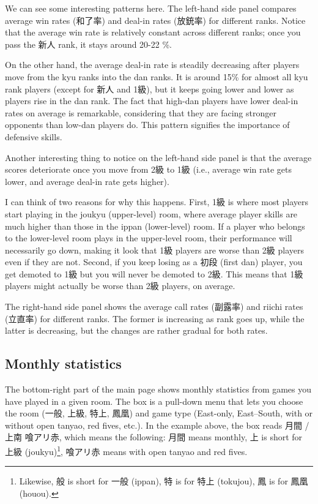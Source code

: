 \bigskip
We can see some interesting patterns here. The left-hand side panel compares average win rates (和了率) and deal-in rates (放銃率) for different ranks. Notice that the average win rate is relatively constant across different ranks; once you pass the 新人 rank, it stays around 20-22 \%. 

\bigskip
On the other hand, the average deal-in rate is steadily decreasing after players move from the {\jap kyu} ranks into the {\jap dan} ranks. It is around 15\% for almost all {\jap kyu} rank players (except for 新人 and 1級), but it keeps going lower and lower as players rise in the {\jap dan} rank. The fact that high-{\jap dan} players have lower deal-in rates on average is remarkable, considering that they are facing stronger opponents than low-{\jap dan} players do. This pattern signifies the importance of defensive skills.

\bigskip

Another interesting thing to notice on the left-hand side panel is that the average scores deteriorate once you move from 2級 to 1級 (i.e., average win rate gets lower, and average deal-in rate gets higher). 

\bigskip
I can think of two reasons for why this happens. First, 1級 is where most players start playing in the {\jap joukyu} (upper-level) room, where average player skills are much higher than those in the {\jap ippan} (lower-level) room. If a player who belongs to the lower-level room plays in the upper-level room, their performance will necessarily go down, making it look that 1級 players are worse than 2級 players even if they are not. Second, if you keep losing as a 初段 (first {\jap dan}) player, you get demoted to 1級 but you will never be demoted to 2級. This means that 1級 players might actually be worse than 2級 players, on average. 

\bigskip

The right-hand side panel shows the average call rates (副露率) and {\jap riichi} rates (立直率) for different ranks. The former is increasing as rank goes up, while the latter is decreasing, but the changes are rather gradual for both rates. 

\subsection{Monthly statistics}
The bottom-right part of the main page shows monthly statistics from games you have played in a given room. The box is a pull-down menu that lets you choose the room (一般, 上級, 特上, 鳳凰) and game type (East-only, East--South, with or without open {\jap tanyao}, red fives, etc.). In the example above, the box reads 月間 / 上南 喰アリ赤, which means the following: 月間 means monthly, 上 is short for 上級 ({\jap joukyu})\footnote{Likewise, 般 is short for 一般 ({\jap ippan}), 特 is for 特上 ({\jap tokujou}), 鳳 is for 鳳凰 ({\jap houou}).}, 喰アリ赤 means with open {\jap tanyao} and red fives.

